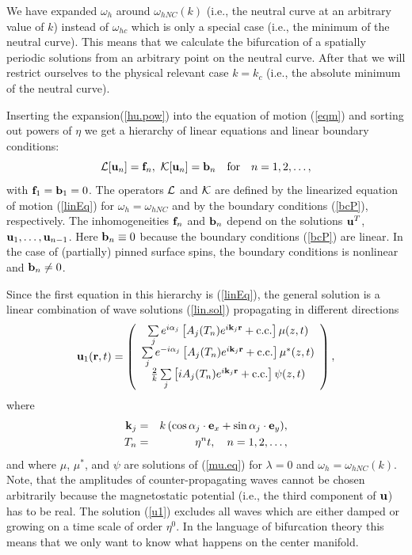 We have expanded $\omega_h$ around $\omega_{hNC}(k)$ (i.e., the
neutral curve at an arbitrary value of $k$) instead of $\omega_{hc}$
which is only a special case (i.e., the minimum of the neutral
curve). This means that we calculate the bifurcation of a spatially
periodic solutions from an arbitrary point on the neutral curve.
After that we will restrict ourselves to the physical relevant case
$k=k_c$ (i.e., the absolute minimum of the neutral curve).

Inserting the expansion(\ref{hu.pow}) into the equation of motion
(\ref{eqm}) and sorting out powers of $\eta$ we get a hierarchy of
linear equations and linear boundary conditions:
\begin{equation}
  {\cal L}[{\bf u}_n]={\bf f}_n,\ {\cal K}[{\bf u}_n]={\bf b}_n
  \quad\mbox{for}\quad n=1,2,\ldots,
  \label{eqm.n}
\end{equation}
with ${\bf f}_1={\bf b}_1=0$. The operators $\cal L$ and $\cal K$ are
defined by the linearized equation of motion (\ref{linEq}) for 
$\omega_h=\omega_{hNC}$ and by the boundary conditions (\ref{bcP}),
respectively.  The inhomogeneities ${\bf f}_n$ and ${\bf b}_n$ depend
on the solutions ${\bf u}^T$, ${\bf u}_1,\ldots,{\bf u}_{n-1}$. Here
${\bf b}_n\equiv 0$ because the boundary conditions (\ref{bcP}) are
linear. In the case of (partially) pinned surface spins, the boundary
conditions is nonlinear and ${\bf b}_n\not=0$.

Since the first equation in this hierarchy is (\ref{linEq}), the
general solution is a linear combination of wave solutions
(\ref{lin.sol}) propagating in different directions
\begin{equation}
  {\bf u}_1({\bf r},t)=\left(\begin{array}{c}\sum\limits_je^{i
   \alpha_j}\left[A_j({T_{{n}}})e^{i{\bf k}_j{\bf r}}+\mbox{c.c.}
   \right]\mu(z,t)\\\sum\limits_je^{-i\alpha_j}\left[A_j({T_{{n}}})
   e^{i{\bf k}_j{\bf r}}+\mbox{c.c.}\right]\mu^*(z,t)\\\frac{2}{k}
   \sum\limits_j\left[iA_j({T_{{n}}})e^{i{\bf k}_j{\bf r}}+
   \mbox{c.c.}\right]\psi(z,t)\end{array}\right),
  \label{u1}
\end{equation}
where 
\begin{eqnarray}
  {\bf k}_j&=&k\,(\cos\alpha_j\cdot{\bf e}_x+\sin\alpha_j\cdot{
   \bf e}_y),\label{u1.k}\\T_n&=&\eta^nt,\quad n=1,2,\ldots,
  \label{u1.T}
\end{eqnarray}
and where $\mu$, $\mu^*$, and $\psi$ are solutions of (\ref{mu.eq})
for $\lambda=0$ and $\omega_h=\omega_{hNC}(k)$. Note, that the
amplitudes of counter-propagating waves cannot be chosen
arbitrarily because the magnetostatic potential (i.e., the third
component of ${\bf u}$) has to be real. The solution (\ref{u1})
excludes all waves which are either damped or growing on a time scale
of order $\eta^0$. In the language of bifurcation theory this means
that we only want to know what happens on the center manifold.

